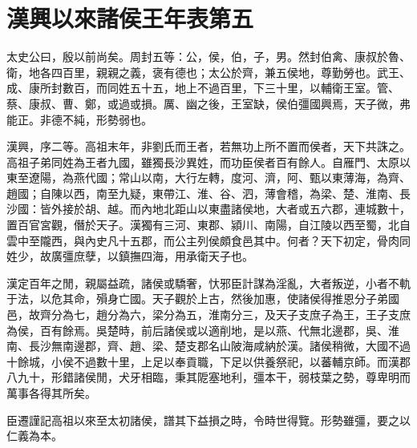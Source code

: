 \onecolumn
\chapter{漢興以來諸侯王年表第五}
			
太史公曰，殷以前尚矣。周封五等：公，侯，伯，子，男。然封伯禽、康叔於魯、衛，地各四百里，親親之義，褒有德也；太公於齊，兼五侯地，尊勤勞也。武王、成、康所封數百，而同姓五十五，地上不過百里，下三十里，以輔衛王室。管、蔡、康叔、曹、鄭，或過或損。厲、幽之後，王室缺，侯伯彊國興焉，天子微，弗能正。非德不純，形勢弱也。

漢興，序二等。高祖末年，非劉氏而王者，若無功上所不置而侯者，天下共誅之。高祖子弟同姓為王者九國，雖獨長沙異姓，而功臣侯者百有餘人。自雁門、太原以東至遼陽，為燕代國；常山以南，大行左轉，度河、濟，阿、甄以東薄海，為齊、趙國；自陳以西，南至九疑，東帶江、淮、谷、泗，薄會稽，為梁、楚、淮南、長沙國：皆外接於胡、越。而內地北距山以東盡諸侯地，大者或五六郡，連城數十，置百官宮觀，僭於天子。漢獨有三河、東郡、潁川、南陽，自江陵以西至蜀，北自雲中至隴西，與內史凡十五郡，而公主列侯頗食邑其中。何者？天下初定，骨肉同姓少，故廣彊庶孽，以鎮撫四海，用承衛天子也。

漢定百年之閒，親屬益疏，諸侯或驕奢，忕邪臣計謀為淫亂，大者叛逆，小者不軌于法，以危其命，殞身亡國。天子觀於上古，然後加惠，使諸侯得推恩分子弟國邑，故齊分為七，趙分為六，梁分為五，淮南分三，及天子支庶子為王，王子支庶為侯，百有餘焉。吳楚時，前后諸侯或以適削地，是以燕、代無北邊郡，吳、淮南、長沙無南邊郡，齊、趙、梁、楚支郡名山陂海咸納於漢。諸侯稍微，大國不過十餘城，小侯不過數十里，上足以奉貢職，下足以供養祭祀，以蕃輔京師。而漢郡八九十，形錯諸侯閒，犬牙相臨，秉其阸塞地利，彊本干，弱枝葉之勢，尊卑明而萬事各得其所矣。

臣遷謹記高祖以來至太初諸侯，譜其下益損之時，令時世得覽。形勢雖彊，要之以仁義為本。

